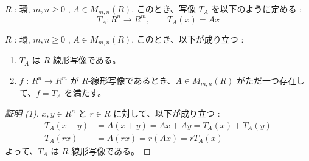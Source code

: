 \documentclass[article,paper=a4paper]{jlreq}
\begin{document}
\begin{dfn}
  \quad $R$ : 環, $m, n \geq 0$ , $A \in M_{m, n}(R)$.
  このとき、写像 $T_A$ を以下のように定める :
  \[T_A \colon R^n \to R^m ,\qquad T_A(x) = Ax\]
\end{dfn}

\begin{prop}
  \quad $R$ : 環, $m, n \geq 0$ , $A \in M_{m, n}(R)$.
  このとき、以下が成り立つ :
\begin{enumerate}[label=(\arabic*)\,]
  \item $T_A$ は $R$-\hspace{0pt}線形写像である。
  \item $f$ : $R^n \to R^m$ が $R$-\hspace{0pt}線形写像であるとき、$A \in M_{m, n}(R)$ がただ一つ存在して、$f = T_A$ を満たす。
\end{enumerate}
\end{prop}

\begin{proof}[証明 (1)]
  $x, y \in R^n$ と $r \in R$ に対して、以下が成り立つ :
  \begin{align*}
    T_A(x+y) &= A(x+y) = Ax + Ay = T_A(x) + T_A(y)\\
    T_A(rx) &= A(rx) = r(Ax) = rT_A(x)
  \end{align*}
  よって、$T_A$ は $R$-\hspace{0pt}線形写像である。
\end{proof}
\end{document}
